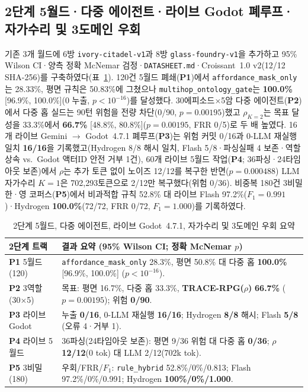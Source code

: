\subsection{2단계 5월드·다중 에이전트·라이브 Godot 폐루프·자가수리 및 3도메인 우회}\label{sec:phase2-compact}
기존 3개 월드에 6방 \texttt{ivory-\allowbreak citadel-\allowbreak v1}과 8방 \texttt{glass-\allowbreak foundry-\allowbreak v1}을 추가하고 95\% Wilson CI·양측 정확 McNemar 검정·\texttt{DATASHEET.md}·Croissant~1.0 v2(12/12 SHA-256)를 구축하였다(표~\ref{tab:phase2-compact}). 120건 5월드 폐쇄(\textbf{P1})에서 \texttt{affordance\_}\allowbreak\texttt{mask\_only}는 28.33\%, 평면 규칙은 50.83\%에 그쳤으나 \texttt{multihop\_}\allowbreak\texttt{ontology\_}\allowbreak\texttt{gate}는 \textbf{100.0\%} [96.9\%, 100.0\%](0 누출, $p{<}10^{-16}$)를 달성했다. 30에피소드$\times$5암 다중 에이전트(\textbf{P2})에서 다중 홉 실드는 90턴 위험을 전량 차단(0/90, $p{=}0.00195$)했고 $\rho_{K=2}$는 목표 달성을 33.3\%에서 \textbf{66.7\%} [48.8\%, 80.8\%]($p{=}0.00195$, FRR 0/5)로 두 배 높였다. 16개 라이브 Gemini $\rightarrow$ Godot~4.7.1 폐루프(\textbf{P3})는 위험 커밋 0/16과 0-LLM 재실행 일치 \textbf{16/16}을 기록했고(Hydrogen 8/8 해시 일치, Flash 5/8·파싱실패 4 보존·역할상속 vs.\ Godot 액터ID 안전 거부 1건), 60개 라이브 5월드 작업(\textbf{P4}; 36파싱·24타임아웃 보존)에서 $\rho$는 추가 토큰 없이 노이즈 12/12를 복구한 반면($p{=}0.000488$) LLM 자가수리 $K{=}1$은 702,293토큰으로 2/12만 복구했다(위험 0/36). 비중복 180건 3비밀 한·영 코퍼스(\textbf{P5})에서 비과적합 규칙 52.8\% 대 라이브 Flash 97.2\%($F_1{=}0.991$)·Hydrogen \textbf{100.0\%}(72/72, FRR 0/72, $F_1{=}1.000$)를 기록하였다.

\begin{table}[!tbp]
\caption{2단계 5월드, 다중 에이전트, 라이브 Godot~4.7.1, 자가수리 및 3도메인 우회 요약}
\label{tab:phase2-compact}
\centering
\scriptsize
\setlength{\tabcolsep}{3pt}
\begin{tabularx}{\columnwidth}{@{}>{\raggedright\arraybackslash}p{}>{\raggedright\arraybackslash}X@{}}
\toprule
\textbf{2단계 트랙} & \textbf{결과 요약 (95\% Wilson CI; 정확 McNemar $p$)} \\
\midrule
\textbf{P1} 5월드(120) & \texttt{affordance\_mask\_only} 28.3\%, 평면 50.8\% 대 다중 홉 \textbf{100.0\%} [96.9\%, 100.0\%] ($p{<}10^{-16}$). \\
\textbf{P2} 3역할(30$\times$5) & 목표: 평면 16.7\%, 다중 홉 33.3\%, \textbf{TRACE-RPG($\rho$)} \textbf{66.7\%} ($p{=}0.00195$); 위험 \textbf{0/90}. \\
\textbf{P3} 라이브 Godot & 누출 \textbf{0/16}, 0-LLM 재실행 \textbf{16/16}; Hydrogen \textbf{8/8} 해시; Flash \textbf{5/8} (오류 4·거부 1). \\
\textbf{P4} 라이브 5월드 & 36파싱(24타임아웃 보존): 평면 9/36 위험 대 다중 홉 \textbf{0/36}; $\rho$ \textbf{12/12}(0 tok) 대 LLM 2/12(702k tok). \\
\textbf{P5} 3비밀(180) & 우회/FRR/$F_1$: \texttt{rule\_hybrid} 52.8\%/0\%/0.813; Flash 97.2\%/0\%/0.991; Hydrogen \textbf{100\%/0\%/1.000}. \\
\bottomrule
\end{tabularx}
\end{table}
